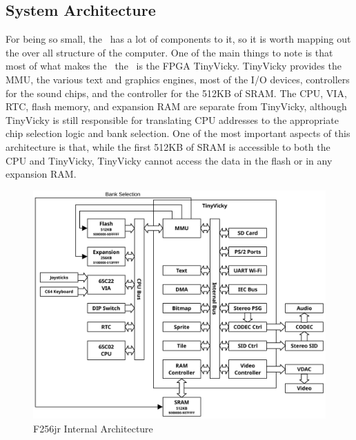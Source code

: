 \subsection*{System Architecture}

For being so small, the \jr\ has a lot of components to it, so it is worth mapping out the over all structure of the computer. One of the main things to note is that most of what makes the \jr\ the \jr\ is the FPGA TinyVicky. TinyVicky provides the MMU, the various text and graphics engines, most of the I/O devices, controllers for the sound chips, and the controller for the 512KB of SRAM. The CPU, VIA, RTC, flash memory, and expansion RAM are separate from TinyVicky, although TinyVicky is still responsible for translating CPU addresses to the appropriate chip selection logic and bank selection. One of the most important aspects of this architecture is that, while the first 512KB of SRAM is accessible to both the CPU and TinyVicky, TinyVicky cannot access the data in the flash or in any expansion RAM.

\begin{figure}[ht]
    \begin{center}
        \includegraphics[scale=0.55]{images/f256jr_layout.pdf}
    \end{center}
    \caption{F256jr Internal Architecture}
    \label{fig:arch}
\end{figure}

